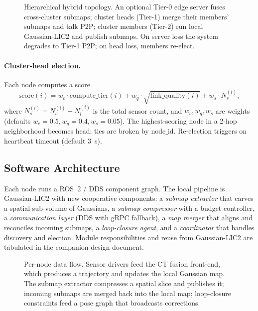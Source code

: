 \begin{figure}[t]
  \centering
  \resizebox{\columnwidth}{!}{}
  \caption{Hierarchical hybrid topology. An optional Tier-0 edge server fuses
  cross-cluster submaps; cluster heads (Tier-1) merge their members' submaps and
  talk P2P; cluster members (Tier-2) run local Gaussian-LIC2 and publish
  submaps. On server loss the system degrades to Tier-1 P2P; on head loss,
  members re-elect.}
  \label{fig:topology}
\end{figure}

\paragraph{Cluster-head election.} Each node computes a score
\begin{equation}
  \text{score}(i) = w_c \cdot \text{compute\_tier}(i) + w_q \cdot \sqrt{\text{link\_quality}(i)} + w_s \cdot N_s^{(i)},
\end{equation}
where $N_s^{(i)} = N_c^{(i)} + N_l^{(i)}$ is the total sensor count, and
$w_c, w_q, w_s$ are weights (defaults $w_c = 0.5, w_q = 0.4, w_s = 0.05$). The
highest-scoring node in a 2-hop neighborhood becomes head; ties are broken by
$\text{node\_id}$. Re-election triggers on heartbeat timeout (default $3$~s).

\subsection{Software Architecture}
\label{sec:software}

Each node runs a ROS~2 / DDS component graph. The local pipeline is
Gaussian-LIC2 with new cooperative components: a \emph{submap extractor} that
carves a spatial sub-volume of Gaussians, a \emph{submap compressor} with a
budget controller, a \emph{communication layer} (DDS with gRPC fallback), a
\emph{map merger} that aligns and reconciles incoming submaps, a
\emph{loop-closure agent}, and a \emph{coordinator} that handles discovery and
election. Module responsibilities and reuse from Gaussian-LIC2 are tabulated in
the companion design document.

\begin{figure}[t]
  \centering
  \resizebox{\columnwidth}{!}{}
  \caption{Per-node data flow. Sensor drivers feed the CT fusion front-end,
  which produces a trajectory and updates the local Gaussian map. The submap
  extractor compresses a spatial slice and publishes it; incoming submaps are
  merged back into the local map; loop-closure constraints feed a pose graph
  that broadcasts corrections.}
  \label{fig:dataflow}
\end{figure}
